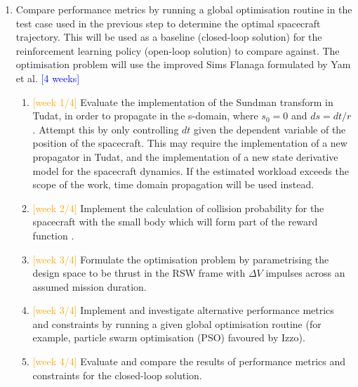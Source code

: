 \begin{enumerate}
    \item Compare performance metrics by running a global optimisation routine in the test case used in the previous step to determine the optimal spacecraft trajectory. This will be used as a baseline (closed-loop solution) for the reinforcement learning policy (open-loop solution) to compare against. The optimisation problem will use the improved Sims Flanaga formulated by Yam et al. \cite{Yam2010} \textcolor{blue}{[4 weeks]}
    \begin{enumerate}
        \item \textcolor{orange}{[week 1/4]} Evaluate the implementation of the Sundman transform in Tudat, in order to propagate in the s-domain, where $s_0=0$ and $ds=dt/r$. Attempt this by only controlling $dt$ given the dependent variable of the position of the spacecraft. This may require the implementation of a new propagator in Tudat, and the implementation of a new state derivative model for the spacecraft dynamics. If the estimated workload exceeds the scope of the work, time domain propagation will be used instead.
        \item \textcolor{orange}{[week 2/4]} Implement the calculation of collision probability for the spacecraft with the small body which will form part of the reward function \cite{Patera2001}.
        \item \textcolor{orange}{[week 3/4]} Formulate the optimisation problem by parametrising the design space to be thrust in the RSW frame with $\Delta{V}$ impulses across an assumed mission duration.
        \item \textcolor{orange}{[week 3/4]} Implement and investigate alternative performance metrics and constraints by running a given global optimisation routine (for example, particle swarm optimisation (PSO) favoured by Izzo).
        \item \textcolor{orange}{[week 4/4]} Evaluate and compare the results of performance metrics and constraints for the closed-loop solution.
    \end{enumerate}


\end{enumerate}
